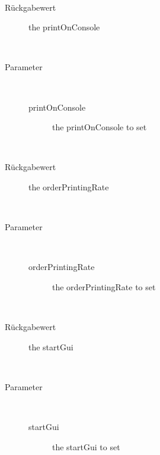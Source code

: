 \begin{description}
\item[{\label{ontologyFramework.OFErrorManagement.OFDebugLogger.getPrintOnConsole()}}]
~ 
\begin{description}
\item[Rückgabewert] 
the printOnConsole
\end{description}
\item[{\label{ontologyFramework.OFErrorManagement.OFDebugLogger.setPrintOnConsole(java.lang.Boolean)}}]
~ 
\begin{description}
\item[Parameter] ~
\begin{description}
\item[printOnConsole]
the printOnConsole to set
\end{description}
\end{description}
\item[{\label{ontologyFramework.OFErrorManagement.OFDebugLogger.getOrderPrintingRate()}}]
~ 
\begin{description}
\item[Rückgabewert] 
the orderPrintingRate
\end{description}
\item[{\label{ontologyFramework.OFErrorManagement.OFDebugLogger.setOrderPrintingRate(java.lang.Integer)}}]
~ 
\begin{description}
\item[Parameter] ~
\begin{description}
\item[orderPrintingRate]
the orderPrintingRate to set
\end{description}
\end{description}
\item[{\label{ontologyFramework.OFErrorManagement.OFDebugLogger.getStartGui()}}]
~ 
\begin{description}
\item[Rückgabewert] 
the startGui
\end{description}
\item[{\label{ontologyFramework.OFErrorManagement.OFDebugLogger.setStartGui(java.lang.Boolean)}}]
~ 
\begin{description}
\item[Parameter] ~
\begin{description}
\item[startGui]
the startGui to set
\end{description}
\end{description}
\end{description}
